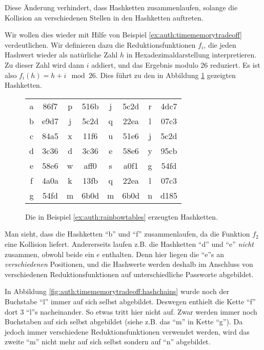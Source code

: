 Diese Änderung verhindert, dass Hashketten zusammenlaufen, solange die
Kollision an verschiedenen Stellen in den Hashketten auftreten.

\begin{beispiel}
\label{ex:auth:rainbowtables} Wir wollen dies wieder mit Hilfe von
Beispiel \ref{ex:auth:timememorytradeoff} verdeutlichen. Wir definieren
dazu die Reduktionsfunktionen $f_i$, die jeden Hashwert wieder als
natürliche Zahl $h$ in Hexadezimaldarstellung interpretieren. Zu dieser
Zahl wird dann $i$ addiert, und das Ergebnis modulo 26 reduziert. Es ist
also $f_i(h) = h + i \mod 26$. Dies führt zu den in Abbildung
\ref{fig:auth:timememorytradeoff:rainbowhashchains} gezeigten
Hashketten.

\begin{figure}[h!]
  \begin{center}
    \begin{tabular}{c@{$\;\hasharrow\;$}c@{\ldots$\;\VRTF[1]\;$}c@{$\;\hasharrow\;$}c@{\ldots$\;\VRTF[2]\;$}c@{$\;\hasharrow\;$}c@{\ldots$\;\VRTF[3]\;$}c@{$\;\hasharrow\;$}c@{\ldots}}
      a & 86f7 & p & 516b & j & 5c2d & r & 4dc7\\
      b & e9d7 & j & 5c2d & q & 22ea & l & 07c3\\ 
      c & 84a5 & x & 11f6 & u & 51e6 & j & 5c2d\\
      d & 3c36 & d & 3c36 & e & 58e6 & y & 95cb\\
      e & 58e6 & w & aff0 & s & a0f1 & g & 54fd\\
      f & 4a0a & k & 13fb & q & 22ea & l & 07c3\\ 
      g & 54fd & m & 6b0d & m & 6b0d & n & d185\\
    \end{tabular}
    \caption{Die in Beispiel \ref{ex:auth:rainbowtables} erzeugten
      Hashketten.}
    \label{fig:auth:timememorytradeoff:rainbowhashchains}
\end{center}
\end{figure} 
Man sieht, dass die Hashketten "`b"' und "`f"'
zusammenlaufen, da die Funktion $f_2$ eine Kollision liefert.
Andererseits laufen z.B. die Hashketten "`d"' und "`e"' \emph{nicht}
zusammen, obwohl beide ein $e$ enthalten. Denn hier liegen die "`e"'s an
\emph{verschiedenen} Positionen, und die Hashwerte werden deshalb im
Anschluss von verschiedenen Reduktionsfunktionen auf unterschiedliche
Passworte abgebildet.

In Abbildung \ref{fig:auth:timememorytradeoff:hashchains} wurde noch der
Buchstabe "`l"' immer auf sich selbst abgebildet. Deswegen enthielt die
Kette "`f"' dort 3 "`l"'s nacheinander.  So etwas tritt hier nicht
auf. Zwar werden immer noch Buchstaben auf sich selbst abgebildet (siehe
z.B. das "`m"' in Kette "`g"'). Da jedoch immer verschiedene
Reduktionsfunktionen verwendet werden, wird das zweite "`m"' nicht mehr
auf sich selbst sondern auf "`n"' abgebildet.
\end{beispiel}

